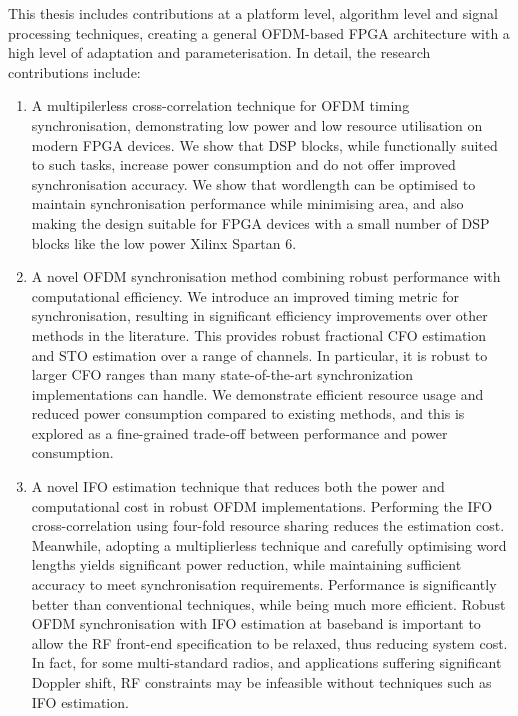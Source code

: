 This thesis includes contributions at a platform level, algorithm level and signal processing techniques, creating a general OFDM-based FPGA architecture with a high level of adaptation and parameterisation. In detail, the research contributions include:
\begin{enumerate}
\item A multipilerless cross-correlation technique for OFDM timing synchronisation, demonstrating low power and low resource utilisation on modern FPGA devices.
We show that DSP blocks, while functionally suited to such tasks, increase power consumption and do not offer improved synchronisation accuracy.
We show that wordlength can be optimised to maintain synchronisation performance while minimising area, and also making the design suitable for FPGA devices with a small number of DSP blocks like the low power Xilinx Spartan 6.

\item A novel OFDM synchronisation method combining robust performance with computational efficiency.
We introduce an improved timing metric for synchronisation, resulting in significant efficiency improvements over other methods in the literature.
This provides robust fractional CFO estimation and STO estimation over a range of channels.
In particular, it is robust to larger CFO ranges than many state-of-the-art synchronization implementations can handle.
We demonstrate efficient resource usage and reduced power consumption compared to existing methods, and this is explored as a fine-grained trade-off between performance and power consumption.

\item A novel IFO estimation technique that reduces both the power and computational cost in robust OFDM implementations.
Performing the IFO cross-correlation using four-fold resource sharing reduces the estimation cost. Meanwhile, adopting a multiplierless technique and carefully optimising word lengths yields significant power reduction, while maintaining sufficient accuracy to meet synchronisation requirements.
Performance is significantly better than conventional techniques, while being much more efficient.
Robust OFDM synchronisation with IFO estimation at baseband is important to allow the RF front-end specification to be relaxed, thus reducing system cost.
In fact, for some multi-standard radios, and applications suffering significant Doppler shift, RF constraints may be infeasible without techniques such as IFO estimation.


\end{enumerate}

